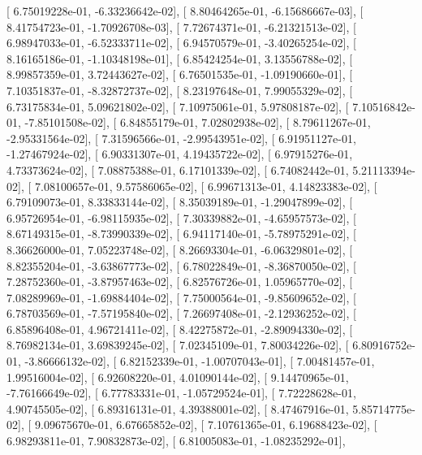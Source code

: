 \documentclass{article}
\begin{document}
       [  6.75019228e-01,  -6.33236642e-02],
       [  8.80464265e-01,  -6.15686667e-03],
       [  8.41754723e-01,  -1.70926708e-03],
       [  7.72674371e-01,  -6.21321513e-02],
       [  6.98947033e-01,  -6.52333711e-02],
       [  6.94570579e-01,  -3.40265254e-02],
       [  8.16165186e-01,  -1.10348198e-01],
       [  6.85424254e-01,   3.13556788e-02],
       [  8.99857359e-01,   3.72443627e-02],
       [  6.76501535e-01,  -1.09190660e-01],
       [  7.10351837e-01,  -8.32872737e-02],
       [  8.23197648e-01,   7.99055329e-02],
       [  6.73175834e-01,   5.09621802e-02],
       [  7.10975061e-01,   5.97808187e-02],
       [  7.10516842e-01,  -7.85101508e-02],
       [  6.84855179e-01,   7.02802938e-02],
       [  8.79611267e-01,  -2.95331564e-02],
       [  7.31596566e-01,  -2.99543951e-02],
       [  6.91951127e-01,  -1.27467924e-02],
       [  6.90331307e-01,   4.19435722e-02],
       [  6.97915276e-01,   4.73373624e-02],
       [  7.08875388e-01,   6.17101339e-02],
       [  6.74082442e-01,   5.21113394e-02],
       [  7.08100657e-01,   9.57586065e-02],
       [  6.99671313e-01,   4.14823383e-02],
       [  6.79109073e-01,   8.33833144e-02],
       [  8.35039189e-01,  -1.29047899e-02],
       [  6.95726954e-01,  -6.98115935e-02],
       [  7.30339882e-01,  -4.65957573e-02],
       [  8.67149315e-01,  -8.73990339e-02],
       [  6.94117140e-01,  -5.78975291e-02],
       [  8.36626000e-01,   7.05223748e-02],
       [  8.26693304e-01,  -6.06329801e-02],
       [  8.82355204e-01,  -3.63867773e-02],
       [  6.78022849e-01,  -8.36870050e-02],
       [  7.28752360e-01,  -3.87957463e-02],
       [  6.82576726e-01,   1.05965770e-02],
       [  7.08289969e-01,  -1.69884404e-02],
       [  7.75000564e-01,  -9.85609652e-02],
       [  6.78703569e-01,  -7.57195840e-02],
       [  7.26697408e-01,  -2.12936252e-02],
       [  6.85896408e-01,   4.96721411e-02],
       [  8.42275872e-01,  -2.89094330e-02],
       [  8.76982134e-01,   3.69839245e-02],
       [  7.02345109e-01,   7.80034226e-02],
       [  6.80916752e-01,  -3.86666132e-02],
       [  6.82152339e-01,  -1.00707043e-01],
       [  7.00481457e-01,   1.99516004e-02],
       [  6.92608220e-01,   4.01090144e-02],
       [  9.14470965e-01,  -7.76166649e-02],
       [  6.77783331e-01,  -1.05729524e-01],
       [  7.72228628e-01,   4.90745505e-02],
       [  6.89316131e-01,   4.39388001e-02],
       [  8.47467916e-01,   5.85714775e-02],
       [  9.09675670e-01,   6.67665852e-02],
       [  7.10761365e-01,   6.19688423e-02],
       [  6.98293811e-01,   7.90832873e-02],
       [  6.81005083e-01,  -1.08235292e-01],
\end{document}
